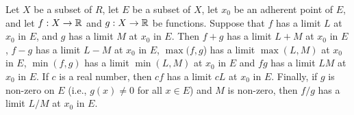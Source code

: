\begin{prop}\label{i:9.3.14}
  Let \(X\) be a subset of \(R\), let \(E\) be a subset of \(X\), let \(x_0\) be an adherent point of \(E\), and let \(f : X \to \mathbb{R}\) and \(g : X \to \mathbb{R}\) be functions.
  Suppose that \(f\) has a limit \(L\) at \(x_0\) in \(E\), and \(g\) has a limit \(M\) at \(x_0\) in \(E\).
  Then \(f + g\) has a limit \(L + M\) at \(x_0\) in \(E\), \(f - g\) has a limit \(L - M\) at \(x_0\) in \(E\), \(\max(f, g\)) has a limit \(\max(L, M)\) at \(x_0\) in \(E\), \(\min(f, g)\) has a limit \(\min(L, M)\) at \(x_0\) in \(E\) and \(fg\) has a limit \(LM\) at \(x_0\) in \(E\).
  If \(c\) is a real number, then \(cf\) has a limit \(cL\) at \(x_0\) in \(E\).
  Finally, if \(g\) is non-zero on \(E\) (i.e., \(g(x) \neq 0\) for all \(x \in E\)) and \(M\) is non-zero, then \(f / g\) has a limit \(L / M\) at \(x_0\) in \(E\).
\end{prop}

